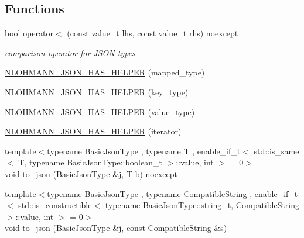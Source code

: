 \subsection*{Functions}
\begin{DoxyCompactItemize}
\item 
bool \hyperlink{namespacenlohmann_1_1detail_a09169efff3bd1771fff29bd92cea19e0}{operator$<$} (const \hyperlink{namespacenlohmann_1_1detail_a90aa5ef615aa8305e9ea20d8a947980f}{value\+\_\+t} lhs, const \hyperlink{namespacenlohmann_1_1detail_a90aa5ef615aa8305e9ea20d8a947980f}{value\+\_\+t} rhs) noexcept
\begin{DoxyCompactList}\small\item\em comparison operator for J\+S\+ON types \end{DoxyCompactList}\item 
\hyperlink{namespacenlohmann_1_1detail_a7b2601c238073c43a07862768b319cf8}{N\+L\+O\+H\+M\+A\+N\+N\+\_\+\+J\+S\+O\+N\+\_\+\+H\+A\+S\+\_\+\+H\+E\+L\+P\+ER} (mapped\+\_\+type)
\item 
\hyperlink{namespacenlohmann_1_1detail_ad19328f0c4ffe2890ecafb7c89e0355b}{N\+L\+O\+H\+M\+A\+N\+N\+\_\+\+J\+S\+O\+N\+\_\+\+H\+A\+S\+\_\+\+H\+E\+L\+P\+ER} (key\+\_\+type)
\item 
\hyperlink{namespacenlohmann_1_1detail_af3e900eb1e0b107c812f7babbb94e69e}{N\+L\+O\+H\+M\+A\+N\+N\+\_\+\+J\+S\+O\+N\+\_\+\+H\+A\+S\+\_\+\+H\+E\+L\+P\+ER} (value\+\_\+type)
\item 
\hyperlink{namespacenlohmann_1_1detail_a6648328c4b1466fdc48f1fcfbff23e2f}{N\+L\+O\+H\+M\+A\+N\+N\+\_\+\+J\+S\+O\+N\+\_\+\+H\+A\+S\+\_\+\+H\+E\+L\+P\+ER} (iterator)
\item 
{\footnotesize template$<$typename Basic\+Json\+Type , typename T , enable\+\_\+if\+\_\+t$<$ std\+::is\+\_\+same$<$ T, typename Basic\+Json\+Type\+::boolean\+\_\+t $>$\+::value, int $>$  = 0$>$ }\\void \hyperlink{namespacenlohmann_1_1detail_a1a804b98cbe89b7e44b698f2ca860490}{to\+\_\+json} (Basic\+Json\+Type \&j, T b) noexcept
\item 
{\footnotesize template$<$typename Basic\+Json\+Type , typename Compatible\+String , enable\+\_\+if\+\_\+t$<$ std\+::is\+\_\+constructible$<$ typename Basic\+Json\+Type\+::string\+\_\+t, Compatible\+String $>$\+::value, int $>$  = 0$>$ }\\void \hyperlink{namespacenlohmann_1_1detail_a7356ed05cdbbb080cee80e1211e1c6c9}{to\+\_\+json} (Basic\+Json\+Type \&j, const Compatible\+String \&s)
\item 

\end{DoxyCompactItemize}
